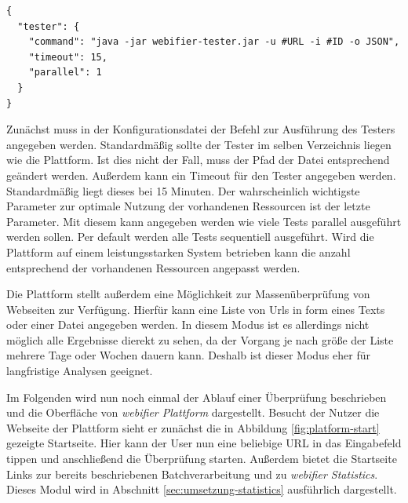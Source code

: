 \newpage

\begin{scriptsize}
\begin{lstlisting}
{
  "tester": {
    "command": "java -jar webifier-tester.jar -u #URL -i #ID -o JSON",
    "timeout": 15,
    "parallel": 1
  }
}
\end{lstlisting}
\end{scriptsize}

Zunächst muss in der Konfigurationsdatei der Befehl zur Ausführung des Testers angegeben werden. Standardmäßig sollte der Tester im selben Verzeichnis liegen wie die Plattform. Ist dies nicht der Fall, muss der Pfad der Datei entsprechend geändert werden. Außerdem kann ein Timeout für den Tester angegeben werden. Standardmäßig liegt dieses bei 15 Minuten. Der wahrscheinlich wichtigste Parameter zur optimale Nutzung der vorhandenen Ressourcen ist der letzte Parameter. Mit diesem kann angegeben werden wie viele Tests parallel ausgeführt werden sollen. Per default werden alle Tests sequentiell ausgeführt. Wird die Plattform auf einem leistungsstarken System betrieben kann die anzahl entsprechend der vorhandenen Ressourcen angepasst werden.

Die Plattform stellt außerdem eine Möglichkeit zur Massenüberprüfung von Webseiten zur Verfügung. Hierfür kann eine Liste von Urls in form eines Texts oder einer Datei angegeben werden. In diesem Modus ist es allerdings nicht möglich alle Ergebnisse dierekt zu sehen, da der Vorgang je nach größe der Liste mehrere Tage oder Wochen dauern kann. Deshalb ist dieser Modus eher für langfristige Analysen geeignet.

Im Folgenden wird nun noch einmal der Ablauf einer Überprüfung beschrieben und die Oberfläche von
\textit{webifier Plattform} dargestellt. Besucht der Nutzer die Webseite der Plattform sieht er
zunächst die in Abbildung \ref{fig:platform-start} gezeigte Startseite. Hier kann der User nun eine
beliebige \acs{URL} in das Eingabefeld tippen und anschließend die Überprüfung starten. Außerdem bietet
die Startseite Links zur bereits beschriebenen Batchverarbeitung und zu \textit{webifier
Statistics}. Dieses Modul wird in Abschnitt \ref{sec:umsetzung-statistics} ausführlich dargestellt.

